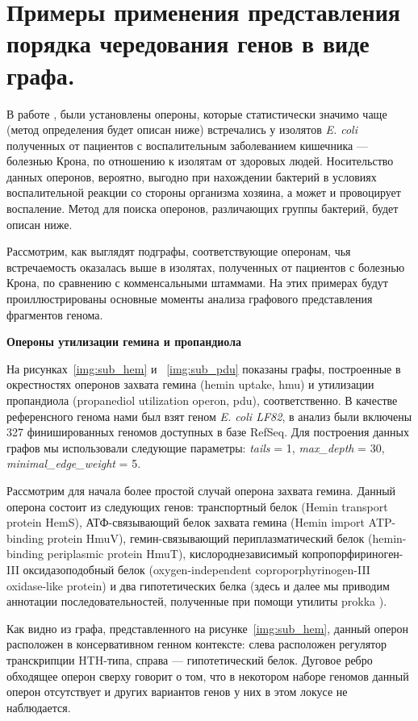 \section{Примеры применения представления порядка чередования генов в виде графа.}

В работе \cite{rakitina2017genome}, были установлены опероны, которые статистически значимо чаще (метод определения будет описан ниже) встречались у изолятов \textit{E. coli} полученных от пациентов с воспалительным заболеванием кишечника --- болезнью Крона, по отношению к изолятам от здоровых людей. Носительство данных оперонов, вероятно, выгодно при нахождении бактерий в условиях воспалительной реакции со стороны организма хозяина, а может и провоцирует воспаление. Метод для поиска оперонов, различающих группы бактерий, будет описан ниже.

Рассмотрим, как выглядят подграфы, соответствующие оперонам, чья встречаемость оказалась выше в изолятах, полученных от пациентов с болезнью Крона, по сравнению с комменсальными штаммами. На этих примерах будут проиллюстрированы основные моменты анализа графового представления фрагментов генома. 

\textbf{Опероны утилизации гемина и пропандиола}

На рисунках~\ref{img:sub_hem} и ~\ref{img:sub_pdu} показаны графы, построенные в окрестностях оперонов захвата гемина (hemin uptake, hmu) и утилизации пропандиола (propanediol utilization operon, pdu), соответственно. В качестве референсного генома нами был взят геном \textit{E. coli LF82}, в анализ были включены 327 финишированных геномов доступных в базе RefSeq. Для построения данных графов мы использовали следующие параметры: \textit{tails} = 1, \textit{max\_depth} = 30, \textit{minimal\_edge\_weight} = 5. 

Рассмотрим для начала более простой случай оперона захвата гемина. Данный оперона состоит из следующих генов: транспортный белок (Hemin transport protein HemS), АТФ-связывающий белок захвата гемина (Hemin import ATP-binding protein HmuV), гемин-связывающий периплазматический белок (hemin-binding periplasmic protein HmuT), кислороднезависимый копропорфириноген-III оксидазоподобный белок (oxygen-independent coproporphyrinogen-III oxidase-like protein) и два гипотетических белка (здесь и далее мы приводим аннотации последовательностей, полученные при помощи утилиты prokka \cite{seemann2014prokka}).

Как видно из графа, представленного на рисунке~\ref{img:sub_hem}, данный оперон расположен в консервативном генном контексте: слева расположен регулятор транскрипции HTH-типа, справа --- гипотетический белок. Дуговое ребро обходящее оперон сверху говорит о том, что в некотором наборе геномов данный оперон отсутствует и других вариантов генов у них в этом локусе не наблюдается. 

